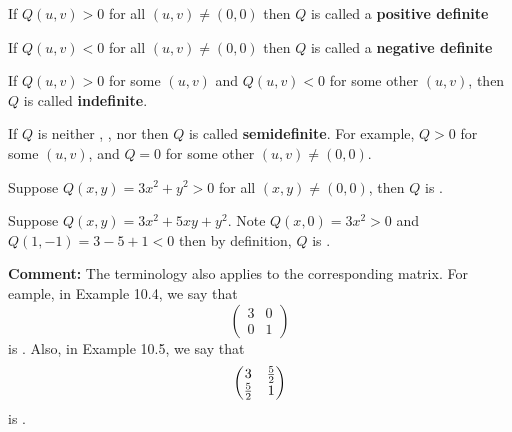 \documentclass[english, 11pt]{article}
\begin{document}
\begin{defn}\label{positive definite}
If $Q(u,v) > 0$ for all $(u,v) \not = (0,0)$ then $Q$ is called a \textbf{positive definite}
\end{defn}
\begin{defn}\label{negative definite}
If $Q(u,v) < 0$ for all $(u,v) \not = (0,0)$ then $Q$ is called a \textbf{negative definite}
\end{defn}
\begin{defn}[indefinite]\label{indefinite}
If $Q(u,v) > 0$ for some $(u,v)$ and $Q(u,v) < 0$ for some other $(u,v)$, then $Q$ is called \textbf{indefinite}.
\end{defn}
\begin{defn}[semidefinite]\label{semidefinite}
If $Q$ is neither , , nor  then $Q$ is called \textbf{semidefinite}. For example, $Q > 0$ for some $(u,v)$, and $Q = 0$ for some other $(u,v) \not = (0,0)$.
\end{defn}

\begin{exmp}
  Suppose $Q(x,y) = 3x^2 + y^2 > 0$ for all $(x,y) \not = (0,0)$, then $Q$ is .
\end{exmp}

\begin{exmp}
  Suppose $Q(x,y) = 3x^2 + 5xy +y^2$. Note $Q(x,0) = 3x^2 > 0$ and $Q(1,-1) = 3-5 + 1 < 0$ then by definition, $Q$ is .
\end{exmp}

\textbf{Comment:} The terminology also applies to the corresponding matrix. For eample, in Example 10.4, we say that
\[ \left( \begin{matrix}
  3 & 0 \\
  0 & 1
\end{matrix} \right) \]
is . Also, in Example 10.5, we say that
\[ \left( \begin{matrix}
  3 & \frac{5}{2} \\
  \frac{5}{2} & 1
\end{matrix} \right) \]
is .

\newcommand{\mtx}[1]{\left( \begin{matrix}
  #1
\end{matrix} \right)}
\end{document}
